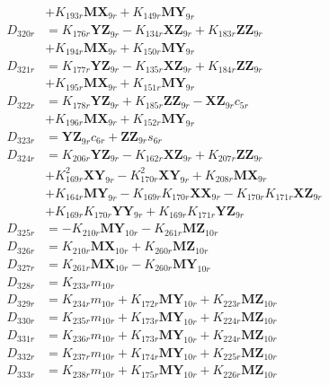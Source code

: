 \begin{multicols}{2}
\begin{align}
&+ K_{193r}\mathbf{MX}_{9r} + K_{149r}\mathbf{MY}_{9r} \nonumber \\
D_{320r} &= K_{176r}\mathbf{YZ}_{9r} - K_{134r}\mathbf{XZ}_{9r} + K_{183r}\mathbf{ZZ}_{9r}  \nonumber \\
&+ K_{194r}\mathbf{MX}_{9r} + K_{150r}\mathbf{MY}_{9r} \nonumber \\
D_{321r} &= K_{177r}\mathbf{YZ}_{9r} - K_{135r}\mathbf{XZ}_{9r} + K_{184r}\mathbf{ZZ}_{9r}  \nonumber \\
&+ K_{195r}\mathbf{MX}_{9r} + K_{151r}\mathbf{MY}_{9r} \nonumber \\
D_{322r} &= K_{178r}\mathbf{YZ}_{9r} + K_{185r}\mathbf{ZZ}_{9r} - \mathbf{XZ}_{9r}c_{5r}  \nonumber \\
&+ K_{196r}\mathbf{MX}_{9r} + K_{152r}\mathbf{MY}_{9r} \nonumber \\
D_{323r} &= \mathbf{YZ}_{9r}c_{6r} + \mathbf{ZZ}_{9r}s_{6r} \nonumber \\
D_{324r} &= K_{206r}\mathbf{YZ}_{9r} - K_{162r}\mathbf{XZ}_{9r} + K_{207r}\mathbf{ZZ}_{9r}  \nonumber \\
&+ K_{169r}^2\mathbf{XY}_{9r} - K_{170r}^2\mathbf{XY}_{9r} + K_{208r}\mathbf{MX}_{9r}  \nonumber \\
&+ K_{164r}\mathbf{MY}_{9r} - K_{169r}K_{170r}\mathbf{XX}_{9r} - K_{170r}K_{171r}\mathbf{XZ}_{9r}  \nonumber \\
&+ K_{169r}K_{170r}\mathbf{YY}_{9r} + K_{169r}K_{171r}\mathbf{YZ}_{9r} \nonumber \\
D_{325r} &= - K_{210r}\mathbf{MY}_{10r} - K_{261r}\mathbf{MZ}_{10r} \nonumber \\
D_{326r} &= K_{210r}\mathbf{MX}_{10r} + K_{260r}\mathbf{MZ}_{10r} \nonumber \\
D_{327r} &= K_{261r}\mathbf{MX}_{10r} - K_{260r}\mathbf{MY}_{10r} \nonumber \\
D_{328r} &= K_{233r}m_{10r} \nonumber \\
D_{329r} &= K_{234r}m_{10r} + K_{172r}\mathbf{MY}_{10r} + K_{223r}\mathbf{MZ}_{10r} \nonumber \\
D_{330r} &= K_{235r}m_{10r} + K_{173r}\mathbf{MY}_{10r} + K_{224r}\mathbf{MZ}_{10r} \nonumber \\
D_{331r} &= K_{236r}m_{10r} + K_{173r}\mathbf{MY}_{10r} + K_{224r}\mathbf{MZ}_{10r} \nonumber \\
D_{332r} &= K_{237r}m_{10r} + K_{174r}\mathbf{MY}_{10r} + K_{225r}\mathbf{MZ}_{10r} \nonumber \\
D_{333r} &= K_{238r}m_{10r} + K_{175r}\mathbf{MY}_{10r} + K_{226r}\mathbf{MZ}_{10r} \nonumber \\

\end{align}
\end{multicols}
